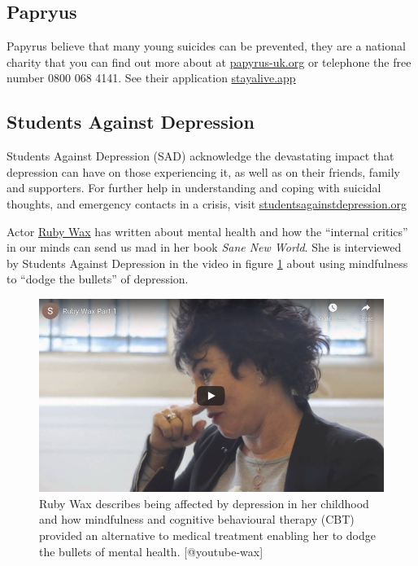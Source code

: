 \documentclass[
]{book}
\begin{document}
\hypertarget{papryus}{%
\subsection{Papryus}\label{papryus}}

Papyrus believe that many young suicides can be prevented, they are a national charity that you can find out more about at \href{https://www.papyrus-uk.org/}{papyrus-uk.org} or telephone the free number 0800 068 4141. See their application \href{https://stayalive.app/}{stayalive.app}

\hypertarget{sad}{%
\subsection{Students Against Depression}\label{sad}}

Students Against Depression (SAD) acknowledge the devastating impact that depression can have on those experiencing it, as well as on their friends, family and supporters. For further help in understanding and coping with suicidal thoughts, and emergency contacts in a crisis, visit \href{https://www.studentsagainstdepression.org/}{studentsagainstdepression.org}

Actor \href{https://en.wikipedia.org/wiki/Ruby_Wax}{Ruby Wax} has written about mental health and how the ``internal critics'' in our minds can send us mad in her book \emph{Sane New World}. \citep{sanenewworld} She is interviewed by Students Against Depression in the video in figure \ref{fig:rubywax-fig} about using mindfulness to ``dodge the bullets'' of depression.

\begin{figure}

{\centering \includegraphics[width=0.99\linewidth]{images/youtube-wax} 

}

\caption{Ruby Wax describes being affected by depression in her childhood and how mindfulness and cognitive behavioural therapy (CBT) provided an alternative to medical treatment enabling her to dodge the bullets of mental health. [@youtube-wax]}\label{fig:rubywax-fig}
\end{figure}
\end{document}
